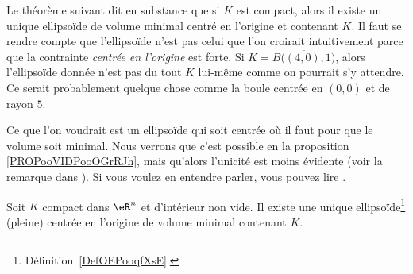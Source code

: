 \begin{normaltext}
	Le théorème suivant dit en substance que si \( K\) est compact, alors il existe un unique ellipsoïde de volume minimal centré en l'origine et contenant \( K\). Il faut se rendre compte que l'ellipsoïde n'est pas celui que l'on croirait intuitivement parce que la contrainte \emph{centrée en l'origine} est forte. Si \( K=\overline{ B\big( (4,0), 1 \big) }\), alors l'ellipsoïde donnée n'est pas du tout \( K\) lui-même comme on pourrait s'y attendre. Ce serait probablement quelque chose comme la boule centrée en \( (0,0)\) et de rayon \( 5\).

	Ce que l'on voudrait est un ellipsoïde qui soit centrée où il faut pour que le volume soit minimal. Nous verrons que c'est possible en la proposition \ref{PROPooVIDPooOGrRJh}, mais qu'alors l'unicité est moins évidente (voir la remarque dans \cite{ooJWHFooGQQhUW}). Si vous voulez en entendre parler, vous pouvez lire \cite{ooASOAooNwZFKS,ooWLGRooFScSaM}.
\end{normaltext}

\begin{proposition}   \label{PropJYVooRMaPok}
	Soit \( K\) compact dans \( \eR^n\) et d'intérieur non vide. Il existe une unique ellipsoïde\footnote{Définition~\ref{DefOEPooqfXsE}.} (pleine) centrée en l'origine de volume minimal contenant \( K\).
\end{proposition}

